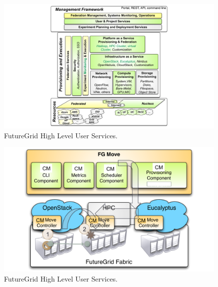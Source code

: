 \documentclass{article}
\begin{document}
\begin{figure}[h!]
  \caption{FutureGrid High Level User Services.}
  \centering
    \includegraphics[width=1.0\textwidth]{images/cm-arch}
\end{figure}

\begin{figure}[h!]
  \caption{FutureGrid High Level User Services.}
  \centering
    \includegraphics[width=1.0\textwidth]{images/shift2}
\end{figure}
\end{document}
